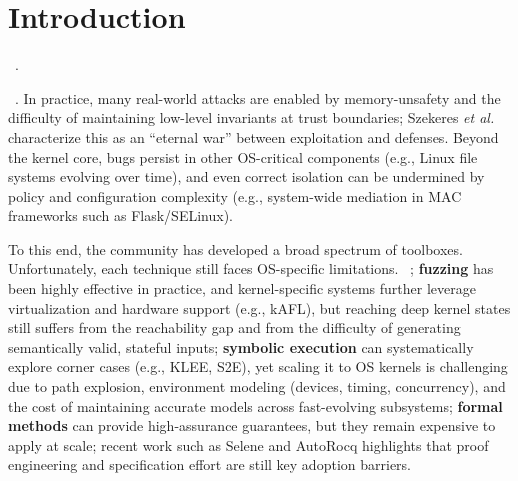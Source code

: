 \section{Introduction}

~.

~.
In practice, many real-world attacks are enabled by memory-unsafety and the difficulty of maintaining low-level invariants at trust boundaries; Szekeres \emph{et al.} characterize this as an ``eternal war'' between exploitation and defenses\cite{szekeres13}. Beyond the kernel core, bugs persist in other OS-critical components (e.g., Linux file systems evolving over time\cite{luAAL14}), and even correct isolation can be undermined by policy and configuration complexity (e.g., system-wide mediation in MAC frameworks such as Flask/SELinux\cite{spencer99flask,loscocco01selinux}).

To this end, the community has developed a broad spectrum of toolboxes.
Unfortunately, each technique still faces OS-specific limitations.
~;
\textbf{fuzzing} has been highly effective in practice\cite{boehme16}, and kernel-specific systems further leverage virtualization and hardware support (e.g., kAFL)\cite{kafl17}, but reaching deep kernel states still suffers from the reachability gap and from the difficulty of generating semantically valid, stateful inputs;
\textbf{symbolic execution} can systematically explore corner cases (e.g., KLEE, S2E)\cite{cadar2008klee,chipounov2011s2e}, yet scaling it to OS kernels is challenging due to path explosion, environment modeling (devices, timing, concurrency), and the cost of maintaining accurate models across fast-evolving subsystems;
\textbf{formal methods} can provide high-assurance guarantees, but they remain expensive to apply at scale; recent work such as Selene and AutoRocq highlights that proof engineering and specification effort are still key adoption barriers\cite{zhang2024selene,tu2025agentic}.

